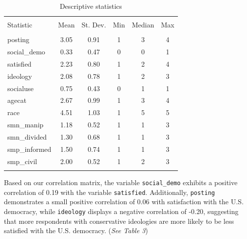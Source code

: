 \documentclass[
]{article}
\begin{document}
\begin{table}[H] \centering 
  \caption{Descriptive statistics} 
  \label{} 
\begin{tabular}{@{\extracolsep{5pt}}lccccc} 
\\[-1.8ex]\hline 
\hline \\[-1.8ex] 
Statistic & \multicolumn{1}{c}{Mean} & \multicolumn{1}{c}{St. Dev.} & \multicolumn{1}{c}{Min} & \multicolumn{1}{c}{Median} & \multicolumn{1}{c}{Max} \\ 
\hline \\[-1.8ex] 
posting & 3.05 & 0.91 & 1 & 3 & 4 \\ 
social\_demo & 0.33 & 0.47 & 0 & 0 & 1 \\ 
satisfied & 2.23 & 0.80 & 1 & 2 & 4 \\ 
ideology & 2.08 & 0.78 & 1 & 2 & 3 \\ 
socialuse & 0.75 & 0.43 & 0 & 1 & 1 \\ 
agecat & 2.67 & 0.99 & 1 & 3 & 4 \\ 
race & 4.51 & 1.03 & 1 & 5 & 5 \\ 
smn\_manip & 1.18 & 0.52 & 1 & 1 & 3 \\ 
smn\_divided & 1.30 & 0.68 & 1 & 1 & 3 \\ 
smp\_informed & 1.50 & 0.74 & 1 & 1 & 3 \\ 
smp\_civil & 2.00 & 0.52 & 1 & 2 & 3 \\ 
\hline \\[-1.8ex] 
\end{tabular} 
\end{table}

Based on our correlation matrix, the variable \texttt{social\_demo}
exhibits a positive correlation of 0.19 with the variable
\texttt{satisfied}. Additionally, \texttt{posting} demonstrates a small
positive correlation of 0.06 with satisfaction with the U.S. democracy,
while \texttt{ideology} displays a negative correlation of -0.20,
suggesting that more respondents with conservative ideologies are more
likely to be less satisfied with the U.S. democracy. (\emph{See Table
3})
\end{document}
